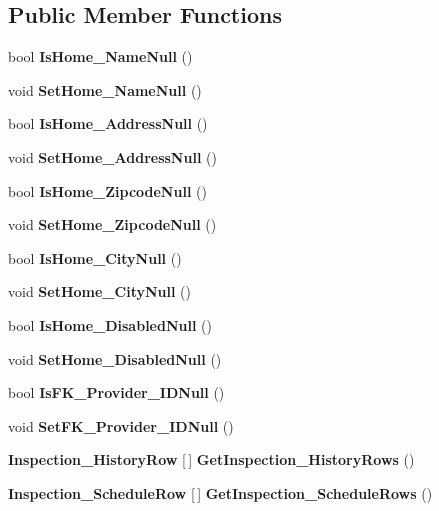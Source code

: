 \subsection*{Public Member Functions}
\begin{DoxyCompactItemize}
\item 
bool \textbf{ Is\+Home\+\_\+\+Name\+Null} ()
\item 
void \textbf{ Set\+Home\+\_\+\+Name\+Null} ()
\item 
bool \textbf{ Is\+Home\+\_\+\+Address\+Null} ()
\item 
void \textbf{ Set\+Home\+\_\+\+Address\+Null} ()
\item 
bool \textbf{ Is\+Home\+\_\+\+Zipcode\+Null} ()
\item 
void \textbf{ Set\+Home\+\_\+\+Zipcode\+Null} ()
\item 
bool \textbf{ Is\+Home\+\_\+\+City\+Null} ()
\item 
void \textbf{ Set\+Home\+\_\+\+City\+Null} ()
\item 
bool \textbf{ Is\+Home\+\_\+\+Disabled\+Null} ()
\item 
void \textbf{ Set\+Home\+\_\+\+Disabled\+Null} ()
\item 
bool \textbf{ Is\+F\+K\+\_\+\+Provider\+\_\+\+I\+D\+Null} ()
\item 
void \textbf{ Set\+F\+K\+\_\+\+Provider\+\_\+\+I\+D\+Null} ()
\item 
\textbf{ Inspection\+\_\+\+History\+Row} [$\,$] \textbf{ Get\+Inspection\+\_\+\+History\+Rows} ()
\item 
\textbf{ Inspection\+\_\+\+Schedule\+Row} [$\,$] \textbf{ Get\+Inspection\+\_\+\+Schedule\+Rows} ()
\end{DoxyCompactItemize}
